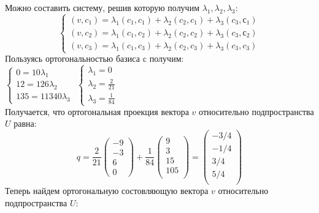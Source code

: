 \documentclass[12pt,a4paper]{scrartcl}
\begin{document}
	\noindent Можно составить систему, решив которую получим $\lambda_1, \lambda_2, \lambda_3$:\\
	 $$\begin{cases}
		 (v, c_1) = \lambda_1(c_1, c_1) + \lambda_2(c_2, c_1) + \lambda_3(c_3, с_1)\\
		 (v, c_2) = \lambda_1(c_1, c_2) + \lambda_2(c_2, c_2) + \lambda_3(c_3, с_2)\\
		 (v, c_3) = \lambda_1(c_1, c_3) + \lambda_2(c_2, c_3) + \lambda_3(c_3, c_3)
	 \end{cases}$$
	 Пользуясь ортогональностью базиса $\mathbb{c}$ получим:\\
	 $\begin{cases}
	 0 = 10\lambda_1\\
	 12 = 126\lambda_2\\
	 135 = 11340\lambda_3
	 \end{cases}$ $\begin{cases}
	 \lambda_1 = 0\\
	 \lambda_2 = \frac{2}{21}\\
	 \lambda_3 = \frac{1}{84}
	 \end{cases}$\\
	 Получается, что ортогональная проекция вектора $v$ относительно подпространства $U$ равна:\\
	 $$q = \frac{2}{21} \begin{pmatrix}
	 -9\\
	 -3\\
	 6\\
	 0
	 \end{pmatrix} + \frac{1}{84} \begin{pmatrix}
	 9\\
	 3\\
	 15\\
	 105\\
	 \end{pmatrix} = \begin{pmatrix}
	 -{3}/{4}\\
	 -{1}/{4}\\
	 {3}/{4}\\
	 {5}/{4}\\
	 \end{pmatrix}
	 $$
	 Теперь найдем ортогональную состовляющую вектора $v$ относительно подпространства $U$:\\
\end{document}

